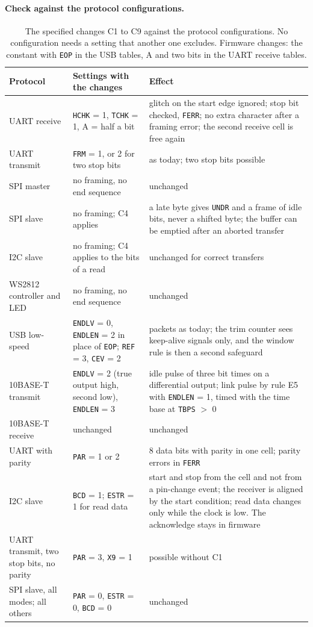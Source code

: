 \documentclass[10pt,a4paper]{article}
\newcommand{\reg}[1]{\texttt{#1}}
\begin{document}
\paragraph{Check against the protocol configurations.}

\begin{table}[H]
\centering\small
\begin{tabularx}{\linewidth}{@{}lLL@{}}
\toprule
Protocol & Settings with the changes & Effect \\
\midrule
UART receive & \reg{HCHK} = 1, \reg{TCHK} = 1, A = half a bit & glitch on the start edge ignored; stop bit checked, \reg{FERR}; no extra character after a framing error; the second receive cell is free again \\
UART transmit & \reg{FRM} = 1, or 2 for two stop bits & as today; two stop bits possible \\
SPI master & no framing, no end sequence & unchanged \\
SPI slave & no framing; C4 applies & a late byte gives \reg{UNDR} and a frame of idle bits, never a shifted byte; the buffer can be emptied after an aborted transfer \\
I2C slave & no framing; C4 applies to the bits of a read & unchanged for correct transfers \\
WS2812 controller and LED & no framing, no end sequence & unchanged \\
USB low-speed & \reg{ENDLV} = 0, \reg{ENDLEN} = 2 in place of \reg{EOP}; \reg{REF} = 3, \reg{CEV} = 2 & packets as today; the trim counter sees keep-alive signals only, and the window rule is then a second safeguard \\
10BASE-T transmit & \reg{ENDLV} = 2 (true output high, second low), \reg{ENDLEN} = 3 & idle pulse of three bit times on a differential output; link pulse by rule E5 with \reg{ENDLEN} = 1, timed with the time base at \reg{TBPS} $>$ 0 \\
10BASE-T receive & unchanged & unchanged \\
UART with parity & \reg{PAR} = 1 or 2 & 8 data bits with parity in one cell; parity errors in \reg{FERR} \\
I2C slave & \reg{BCD} = 1; \reg{ESTR} = 1 for read data & start and stop from the cell and not from a pin-change event; the receiver is aligned by the start condition; read data changes only while the clock is low. The acknowledge stays in firmware \\
UART transmit, two stop bits, no parity & \reg{PAR} = 3, \reg{X9} = 1 & possible without C1 \\
SPI slave, all modes; all others & \reg{PAR} = 0, \reg{ESTR} = 0, \reg{BCD} = 0 & unchanged \\
\bottomrule
\end{tabularx}
\caption{The specified changes C1 to C9 against the protocol configurations. No configuration needs a setting that
another one excludes. Firmware changes: the constant with \reg{EOP} in the USB tables, A and two bits in the UART
receive tables.}
\end{table}
\end{document}
